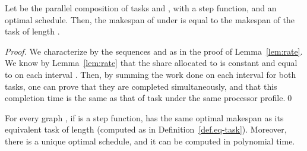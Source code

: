 \documentclass{llncs}
\begin{document}
\begin{lemma}
  \label{lem:ratequiv}
  Let  be the parallel composition of tasks  and , with
   a step function, and  an optimal schedule. Then, the
  makespan of  under  is equal to the makespan of the task
   of length .
\end{lemma}

\begin{proof}  
  We characterize  by the sequences  and  as in the proof of
  Lemma~\ref{lem:rate}. We know by Lemma~\ref{lem:rate} that the share allocated
  to  is constant and equal to  on each interval .
Then, by summing the work done on each interval for both tasks, one can prove
  that they are completed simultaneously, and that this completion time is the
  same as that of task  under the same processor profile.\qed
\end{proof}



\begin{theorem}
  \label{th:step}
  For every graph , if  is a step function,  has the same
  optimal makespan as its equivalent task  of length  (computed as in Definition~\ref{def.eq-task}). Moreover, there is a unique optimal schedule, and it can be
  computed in polynomial time.
\end{theorem}
\end{document}
